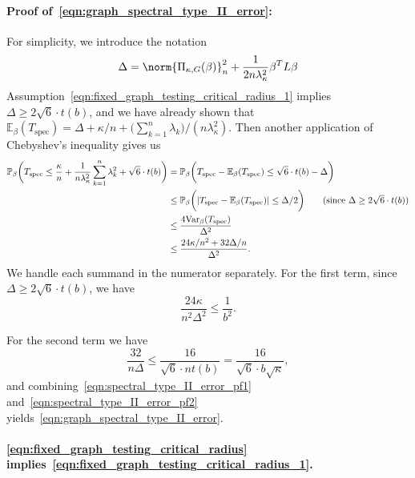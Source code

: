 \documentclass{article}
\newcommand{\abs}[1]{\left \lvert #1 \right \rvert}
\newcommand{\Var}{\mathrm{Var}}
\newcommand{\1}{\mathbf{1}}
\newcommand{\Pbb}{\mathbb{P}}
\newcommand{\Ebb}{\mathbb{E}}
\newcommand{\spec}{\mathrm{spec}}
\theoremstyle{alden}
\theoremstyle{aldenthm}
\theoremstyle{definition}
\theoremstyle{remark}
\begin{document}
\paragraph{Proof of~\eqref{eqn:graph_spectral_type_II_error}:} For simplicity, we introduce the notation
\begin{equation*}
\Delta = \norm{\Pi_{\kappa,G}(\beta)}_n^2 + \frac{1}{2 n \lambda_{\kappa}^2} \beta^T L \beta
\end{equation*}
Assumption~\eqref{eqn:fixed_graph_testing_critical_radius_1} implies $\Delta \geq 2 \sqrt{6} \cdot t(b)$, and we have already shown that $\Ebb_{\beta}(T_{\spec}) = \Delta + \kappa/n + \bigl(\sum_{k = 1}^{n} \lambda_k\bigr)/(n\lambda_{\kappa}^2)$. Then another application of Chebyshev's inequality gives us
\begin{align*}
\Pbb_{\beta}\biggl(T_{\spec} \leq \frac{\kappa}{n} + \frac{1}{n\lambda_{\kappa}^2}\sum_{k = 1}^{n} \lambda_k^2 + \sqrt{6} \cdot t(b)\biggr) & = \Pbb_{\beta}\biggl(T_{\spec} - \Ebb_{\beta}(T_{\spec}) \leq \sqrt{6} \cdot t(b) - \Delta \biggr) \\
& \leq \Pbb_{\beta}\biggl(\abs{T_{\spec} - \Ebb_{\beta}(T_{\spec})} \leq \Delta/2 \biggr) \tag{since $\Delta \geq 2 \sqrt{6} \cdot t(b)$}	\\
& \leq \frac{4\Var_{\beta}(T_{\spec})}{\Delta^2} \\
& \leq \frac{24\kappa/n^2 + 32\Delta/n}{\Delta^2}.
\end{align*}
We handle each summand in the numerator separately. For the first term, since $\Delta \geq 2 \sqrt{6} \cdot t(b)$, we have
\begin{equation}
\label{eqn:spectral_type_II_error_pf1}
\frac{24\kappa}{n^2\Delta^2} \leq \frac{1}{b^2}.
\end{equation}

For the second term we have
\begin{equation}
\label{eqn:spectral_type_II_error_pf2}
\frac{32}{n\Delta} \leq \frac{16}{\sqrt{6} \cdot nt(b)} = \frac{16}{\sqrt{6} \cdot b\sqrt{\kappa}}, 
\end{equation}
and combining~\eqref{eqn:spectral_type_II_error_pf1} and~\eqref{eqn:spectral_type_II_error_pf2} yields~\eqref{eqn:graph_spectral_type_II_error}.

\paragraph{\eqref{eqn:fixed_graph_testing_critical_radius} implies~\eqref{eqn:fixed_graph_testing_critical_radius_1}.}
\end{document}
